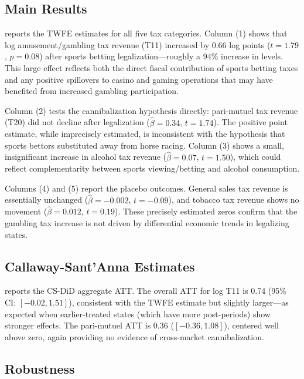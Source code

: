 \documentclass[12pt]{article}
\begin{document}
\subsection{Main Results}

 reports the TWFE estimates for all five tax categories. Column (1) shows that log amusement/gambling tax revenue (T11) increased by 0.66 log points ($t = 1.79$, $p = 0.08$) after sports betting legalization---roughly a 94\% increase in levels. This large effect reflects both the direct fiscal contribution of sports betting taxes and any positive spillovers to casino and gaming operations that may have benefited from increased gambling participation.



Column (2) tests the cannibalization hypothesis directly: pari-mutuel tax revenue (T20) did not decline after legalization ($\hat{\beta} = 0.34$, $t = 1.74$). The positive point estimate, while imprecisely estimated, is inconsistent with the hypothesis that sports bettors substituted away from horse racing. Column (3) shows a small, insignificant increase in alcohol tax revenue ($\hat{\beta} = 0.07$, $t = 1.50$), which could reflect complementarity between sports viewing/betting and alcohol consumption.

Columns (4) and (5) report the placebo outcomes. General sales tax revenue is essentially unchanged ($\hat{\beta} = -0.002$, $t = -0.09$), and tobacco tax revenue shows no movement ($\hat{\beta} = 0.012$, $t = 0.19$). These precisely estimated zeros confirm that the gambling tax increase is not driven by differential economic trends in legalizing states.

\subsection{Callaway-Sant'Anna Estimates}

 reports the CS-DiD aggregate ATT. The overall ATT for log T11 is 0.74 (95\% CI: $[-0.02, 1.51]$), consistent with the TWFE estimate but slightly larger---as expected when earlier-treated states (which have more post-periods) show stronger effects. The pari-mutuel ATT is 0.36 ($[-0.36, 1.08]$), centered well above zero, again providing no evidence of cross-market cannibalization.



\subsection{Robustness}
\end{document}
